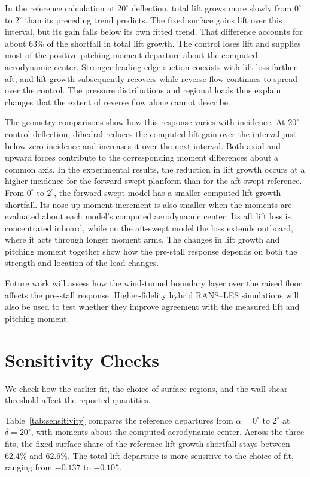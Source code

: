 \documentclass[journal]{new-aiaa}
\newcommand{\degc}{^\circ}
\begin{document}
In the reference calculation at $20\degc$ deflection, total lift grows more slowly from $0\degc$ to $2\degc$ than its preceding trend predicts. The fixed surface gains lift over this interval, but its gain falls below its own fitted trend. That difference accounts for about 63\% of the shortfall in total lift growth. The control loses lift and supplies most of the positive pitching-moment departure about the computed aerodynamic center. Stronger leading-edge suction coexists with lift loss farther aft, and lift growth subsequently recovers while reverse flow continues to spread over the control. The pressure distributions and regional loads thus explain changes that the extent of reverse flow alone cannot describe.

The geometry comparisons show how this response varies with incidence. At $20\degc$ control deflection, dihedral reduces the computed lift gain over the interval just below zero incidence and increases it over the next interval. Both axial and upward forces contribute to the corresponding moment differences about a common axis. In the experimental results, the reduction in lift growth occurs at a higher incidence for the forward-swept planform than for the aft-swept reference. From $0\degc$ to $2\degc$, the forward-swept model has a smaller computed lift-growth shortfall. Its nose-up moment increment is also smaller when the moments are evaluated about each model's computed aerodynamic center. Its aft lift loss is concentrated inboard, while on the aft-swept model the loss extends outboard, where it acts through longer moment arms. The changes in lift growth and pitching moment together show how the pre-stall response depends on both the strength and location of the load changes.

Future work will assess how the wind-tunnel boundary layer over the raised floor affects the pre-stall response. Higher-fidelity hybrid RANS--LES simulations will also be used to test whether they improve agreement with the measured lift and pitching moment.
\appendix
\label{end:sec:conclusions}
\section{Sensitivity Checks}\label{app:sensitivity}
We check how the earlier fit, the choice of surface regions, and the wall-shear threshold affect the reported quantities.

Table~\ref{tab:sensitivity} compares the reference departures from $\alpha=0\degc$ to $2\degc$ at $\delta=20\degc$, with moments about the computed aerodynamic center. Across the three fits, the fixed-surface share of the reference lift-growth shortfall stays between 62.4\% and 62.6\%. The total lift departure is more sensitive to the choice of fit, ranging from $-0.137$ to $-0.105$.
\end{document}

